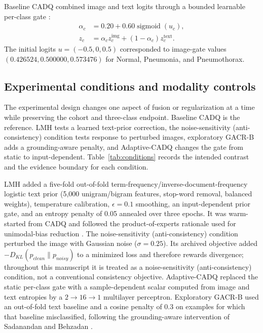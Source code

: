 \documentclass[10pt,a4paper,twocolumn]{article}
\begin{document}
Baseline CADQ combined image and text logits through a bounded learnable
per-class gate \cite{arevalo2017gmu}:
\begin{equation}
\begin{aligned}
\alpha_c&=0.20+0.60\operatorname{sigmoid}(u_c),\\
z_c&=\alpha_c z^{\mathrm{img}}_c+(1-\alpha_c)z^{\mathrm{text}}_c.
\end{aligned}
\end{equation}
The initial logits $u=(-0.5,0,0.5)$ corresponded to image-gate values
$(0.426524,0.500000,0.573476)$ for Normal, Pneumonia, and Pneumothorax.

\subsection{Experimental conditions and modality controls}\label{sec:conditions}

The experimental design changes one aspect of fusion or regularization at a
time while preserving the cohort and three-class endpoint. Baseline CADQ is the
reference. LMH tests a learned text-prior correction, the noise-sensitivity
(anti-consistency) condition tests response to perturbed images, exploratory
GACR-B adds a grounding-aware penalty, and Adaptive-CADQ changes the gate from
static to input-dependent. Table~\ref{tab:conditions} records the intended
contrast and the evidence boundary for each condition.

LMH added a five-fold out-of-fold term-frequency/inverse-document-frequency
logistic text prior (5,000 unigram/bigram features, stop-word removal, balanced
weights), temperature calibration, $\epsilon=0.1$ smoothing, an input-dependent
prior gate, and an entropy penalty of 0.05 annealed over three epochs. It was
warm-started from CADQ and followed the product-of-experts rationale used for
unimodal-bias reduction \cite{cadene2019rubi}. The noise-sensitivity
(anti-consistency) condition perturbed the
image with Gaussian noise ($\sigma=0.25$). Its archived objective added
$-D_{KL}(p_{clean}\|p_{noisy})$ to a minimized loss and therefore rewards
divergence; throughout this manuscript it is treated as a noise-sensitivity
(anti-consistency) condition, not a conventional consistency objective.
Adaptive-CADQ replaced the static per-class gate with a sample-dependent scalar
computed from image and text entropies by a $2\rightarrow16\rightarrow1$
multilayer perceptron. Exploratory GACR-B used an out-of-fold text baseline and
a cosine penalty of 0.3 on examples for which that baseline misclassified, following
the grounding-aware intervention of Sadanandan and Behzadan
\cite{sadanandan2026consistentdangerous}.
\end{document}
